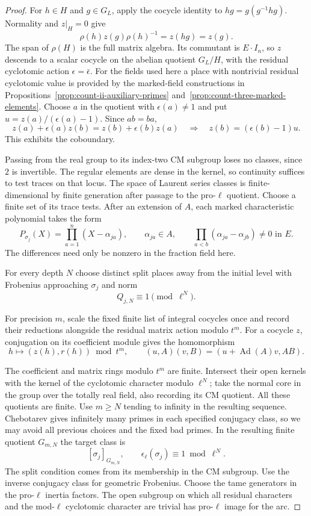 \begin{proof}
For \(h\in H\) and \(g\in G_L\), apply the cocycle identity to
\(hg=g(g^{-1}hg)\). Normality and \(z|_H=0\) give
\[
 \rho(h)z(g)\rho(h)^{-1}=z(hg)=z(g).
\]
The span of \(\rho(H)\) is the full matrix algebra.
Its commutant is \(E\cdot I_n\), so \(z\) descends to a scalar
cocycle on the abelian quotient \(G_L/H\), with the residual
cyclotomic action \(\epsilon=\bar\epsilon\).
For the fields used here a place with nontrivial residual cyclotomic
value is provided by the marked-field constructions in
Propositions~\ref{prop:count-ii-auxiliary-primes}
and~\ref{prop:count-three-marked-elements}. Choose \(a\) in
the quotient with \(\epsilon(a)\ne1\) and put
\(u=z(a)/(\epsilon(a)-1)\). Since \(ab=ba\),
\[
 z(a)+\epsilon(a)z(b)=z(b)+\epsilon(b)z(a)
 \quad\Longrightarrow\quad z(b)=(\epsilon(b)-1)u .
\]
This exhibits the coboundary.

Passing from the real group to its index-two CM subgroup
loses no classes, since \(2\) is invertible. The regular
elements are dense in the kernel, so continuity suffices to
test traces on that locus. The space of Laurent series classes
is finite-dimensional by finite generation after passage to
the pro-\(\ell\) quotient. Choose a finite set of its trace
tests. After an extension of \(A\), each marked characteristic polynomial takes the form
\[
 P_{\sigma_j}(X)=\prod_{a=1}^n (X-\alpha_{ja}),\qquad
 \alpha_{ja}\in A,\qquad \prod_{a<b}(\alpha_{ja}-\alpha_{jb})\ne0\text{ in }E .
\]
The differences need only be nonzero in the fraction field here.

For every depth \(N\) choose distinct split places away from
the initial level with Frobenius approaching \(\sigma_j\) and
norm
\[
 Q_{j,N}\equiv1\pmod{\ell^N}.
\]

For precision \(m\), scale the fixed finite list of integral
cocycles once and record their reductions alongside the residual
matrix action modulo \(t^m\). For a cocycle \(z\), conjugation on its coefficient module gives the homomorphism
\[
 h\longmapsto (z(h),r(h))\bmod t^m,\qquad
 (u,A)(v,B)=(u+\operatorname{Ad}(A)v,AB).
\]

The coefficient and matrix rings modulo \(t^m\) are finite. Intersect their open kernels
with the kernel of the cyclotomic character modulo \(\ell^N\);
take the normal core in the group over the totally real field,
also recording its CM quotient. All these quotients are finite.
Use \(m\ge N\) tending to infinity in the resulting sequence.
Chebotarev gives infinitely many primes in each specified
conjugacy class, so we may avoid all previous choices and the
fixed bad primes.
In the resulting finite quotient \(G_{m,N}\) the target class is
\[
          [\sigma_j]_{G_{m,N}},\qquad
          \epsilon_\ell(\sigma_j)\equiv1\bmod\ell^N .
\]
The split condition comes from its membership in the CM
subgroup. Use the inverse conjugacy class for geometric Frobenius.
Choose the tame generators in the pro-\(\ell\) inertia factors. The open subgroup on which all
residual characters and the mod-\(\ell\) cyclotomic character
are trivial has pro-\(\ell\) image for the arc.


\end{proof}
